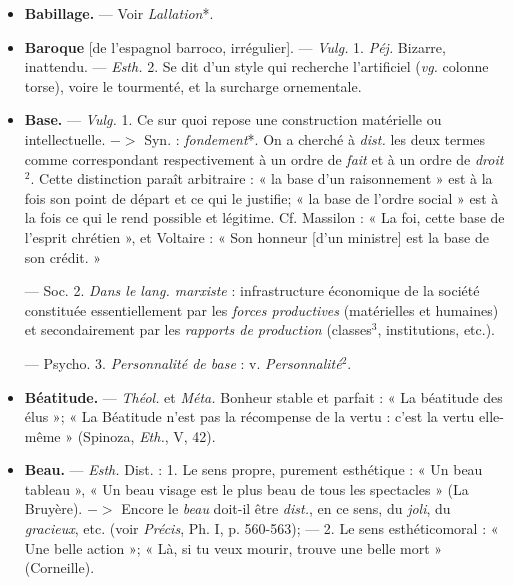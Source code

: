 
	\begin{itemize}[leftmargin=1cm, label=, itemsep=1pt]

\item {\bf Babillage.} — Voir {\it Lallation}*.

\item {\bf Baroque} [de l'espagnol {\it }barroco, irrégulier]. — \textsf{\textit {Vulg.}} 1. {\it Péj.} Bizarre,
inattendu. — \textsf{\textit {Esth.}} 2. Se dit d’un
style qui recherche l’artificiel ({\it vg.}
colonne torse), voire le tourmenté,
et la surcharge ornementale.

\item {\bf Base.} — \textsf{\textit {Vulg.}} 1. Ce sur quoi repose
une construction matérielle ou intellectuelle. $->$ Syn. : {\it fondement}*. On
a cherché à {\it dist.} les deux termes
comme correspondant respectivement à un ordre de {\it fait} et à un ordre
de {\it droit}$^2$. Cette distinction paraît
arbitraire : « la base d’un raisonnement » est à la fois son point de
départ et ce qui le justifie; « la base
de l’ordre social » est à la fois ce qui
le rend possible et légitime. Cf. Massilon : « La foi, cette base de l'esprit
chrétien », et Voltaire : « Son honneur [d'un ministre] est la base de
son crédit. »

— Soc. 2. {\it Dans le lang. marxiste} :
infrastructure économique de la
société constituée essentiellement
par les {\it forces productives} (matérielles
et humaines) et secondairement par
les {\it rapports de production} (classes$^3$,
institutions, etc.).

— Psycho. 3. {\it Personnalité de base} :
v. {\it Personnalité}$^2$.

\item {\bf Béatitude.} — \textsf{\textit {Théol.}} et \textsf{\textit {Méta.}} Bonheur
stable et parfait : « La béatitude des
élus »; « La Béatitude n’est pas la
récompense de la vertu : c’est la vertu elle-même » (Spinoza, {\it Eth.}, V, 42).

\item {\bf Beau.} — \textsf{\textit {Esth.}} Dist. : 1. Le sens propre,
purement esthétique : « Un beau
tableau », « Un beau visage est le
plus beau de tous les spectacles » (La
Bruyère). $->$ Encore le {\it beau} doit-il
être {\it dist.}, en ce sens, du {\it joli}, du
{\it gracieux}, etc. (voir {\it Précis}, Ph. I,
p. 560-563); — 2. Le sens esthéticomoral : « Une belle action »; « Là, si
tu veux mourir, trouve une belle
mort » (Corneille).
 

\end{itemize}
